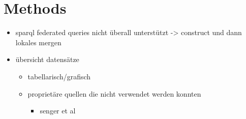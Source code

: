 \chapter{Methods}
\label{cha:methods}

\begin{itemize}
\item sparql federated queries nicht überall unterstützt -> construct und dann lokales mergen
\item übersicht datensätze
  \begin{itemize}
  \item tabellarisch/grafisch
  \item proprietäre quellen die nicht verwendet werden konnten
  \begin{itemize}
  \item senger et al
  \end{itemize}
  \end{itemize}
\end{itemize}

